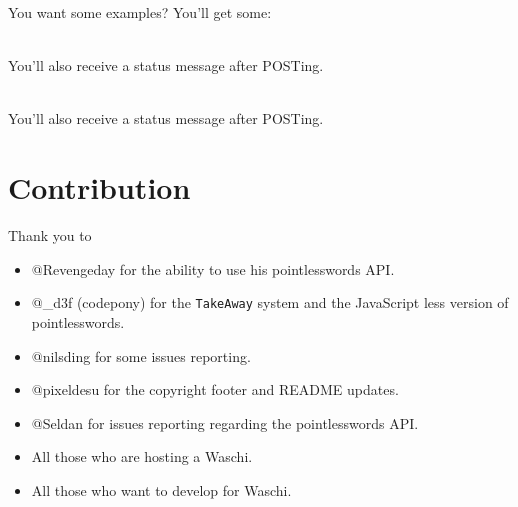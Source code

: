 \documentclass[letterpaper,twoside]{scrartcl}
\begin{document}
   You want some examples? You'll get some:\\
   \newline\newline


   \\
   \newline
   You'll also receive a status message after POSTing.\newline\newline

   \\
   \newline
   You'll also receive a status message after POSTing.\newline\newline


 \newpage


 \section{Contribution}
  Thank you to \newline
  \begin{itemize}
   \item @Revengeday for the ability to use his pointlesswords API.
   \item @\_d3f (codepony) for the \texttt{TakeAway} system and the JavaScript less version of pointlesswords.
   \item @nilsding for some issues reporting.
   \item @pixeldesu for the copyright footer and README updates.
   \item @Seldan for issues reporting regarding the pointlesswords API.
   \item All those who are hosting a Waschi.
   \item All those who want to develop for Waschi.
  \end{itemize}
\end{document}
